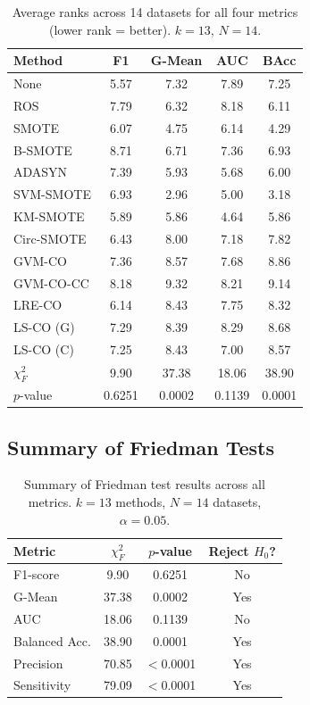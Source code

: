 \begin{table}[H]
\centering
\caption{Average ranks across 14 datasets for all four metrics (lower rank = better). $k=13$, $N=14$.}
\label{tab:stat:ranks_all}
\begin{tabular}{lcccc}
\toprule
\textbf{Method} & \textbf{F1} & \textbf{G-Mean} & \textbf{AUC} & \textbf{BAcc} \\
\midrule
None       & 5.57 & 7.32 & 7.89 & 7.25 \\
ROS        & 7.79 & 6.32 & 8.18 & 6.11 \\
SMOTE      & 6.07 & 4.75 & 6.14 & 4.29 \\
B-SMOTE    & 8.71 & 6.71 & 7.36 & 6.93 \\
ADASYN     & 7.39 & 5.93 & 5.68 & 6.00 \\
SVM-SMOTE  & 6.93 & 2.96 & 5.00 & 3.18 \\
KM-SMOTE   & 5.89 & 5.86 & 4.64 & 5.86 \\
Circ-SMOTE & 6.43 & 8.00 & 7.18 & 7.82 \\
\midrule
GVM-CO     & 7.36 & 8.57 & 7.68 & 8.86 \\
GVM-CO-CC  & 8.18 & 9.32 & 8.21 & 9.14 \\
LRE-CO     & 6.14 & 8.43 & 7.75 & 8.32 \\
LS-CO (G)  & 7.29 & 8.39 & 8.29 & 8.68 \\
LS-CO (C)  & 7.25 & 8.43 & 7.00 & 8.57 \\
\midrule
$\chi_F^2$ & 9.90 & 37.38 & 18.06 & 38.90 \\
$p$-value  & 0.6251 & 0.0002 & 0.1139 & 0.0001 \\
\bottomrule
\end{tabular}
\end{table}

\subsection{Summary of Friedman Tests}

\begin{table}[H]
\centering
\caption{Summary of Friedman test results across all metrics. $k = 13$ methods, $N = 14$ datasets, $\alpha = 0.05$.}
\label{tab:stat:friedman_summary}
\begin{tabular}{lccc}
\toprule
\textbf{Metric} & \textbf{$\chi_F^2$} & \textbf{$p$-value} & \textbf{Reject $H_0$?} \\
\midrule
F1-score       & 9.90  & 0.6251     & No \\
G-Mean         & 37.38 & 0.0002     & Yes \\
AUC            & 18.06 & 0.1139     & No \\
Balanced Acc.  & 38.90 & 0.0001     & Yes \\
Precision      & 70.85 & $<$0.0001  & Yes \\
Sensitivity    & 79.09 & $<$0.0001  & Yes \\
\bottomrule
\end{tabular}
\end{table}

